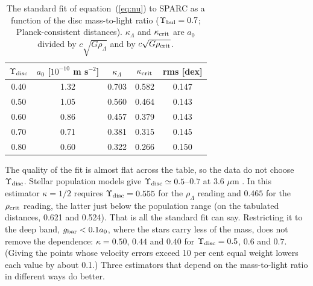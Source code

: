 \documentclass[fleqn,usenatbib]{mnras}
\begin{document}
\begin{table}
\caption{The standard fit of equation~(\ref{eq:nu}) to SPARC as a function of the disc mass-to-light ratio ($\Upsilon_{\rm bul}=0.7$; Planck-consistent distances). $\kappa_\Lambda$ and $\kappa_{\rm crit}$ are $a_0$ divided by $c\sqrt{G\rho_\Lambda}$ and by $c\sqrt{G\rho_{\rm crit}}$.}
\label{tab:upsilon}
\begin{tabular}{ccccc}
\toprule
$\Upsilon_{\rm disc}$ & $a_0$ [$10^{-10}$ m s$^{-2}$] & $\kappa_\Lambda$ & $\kappa_{\rm crit}$ & rms [dex]\\
\midrule
0.40 & 1.32 & 0.703 & 0.582 & 0.147\\
0.50 & 1.05 & 0.560 & 0.464 & 0.143\\
0.60 & 0.86 & 0.457 & 0.379 & 0.143\\
0.70 & 0.71 & 0.381 & 0.315 & 0.145\\
0.80 & 0.60 & 0.322 & 0.266 & 0.150\\
\bottomrule
\end{tabular}
\end{table}

The quality of the fit is almost flat across the table, so the data do not choose $\Upsilon_{\rm disc}$. Stellar population models give $\Upsilon_{\rm disc}\simeq0.5$--$0.7$ at 3.6 $\mu$m \citep{Meidt2014,Schombert2019}. In this estimator $\kappa=1/2$ requires $\Upsilon_{\rm disc}=0.555$ for the $\rho_\Lambda$ reading and $0.465$ for the $\rho_{\rm crit}$ reading, the latter just below the population range (on the tabulated distances, 0.621 and 0.524). That is all the standard fit can say. Restricting it to the deep band, $g_{\rm bar}<0.1a_0$, where the stars carry less of the mass, does not remove the dependence: $\kappa=0.50$, $0.44$ and $0.40$ for $\Upsilon_{\rm disc}=0.5$, $0.6$ and $0.7$. (Giving the points whose velocity errors exceed 10 per cent equal weight lowers each value by about 0.1.) Three estimators that depend on the mass-to-light ratio in different ways do better.
\end{document}
